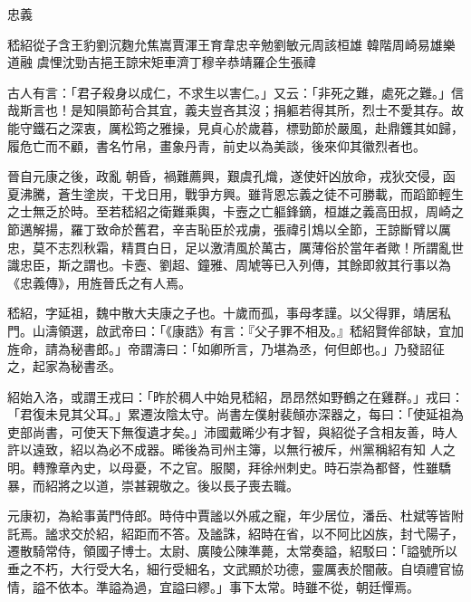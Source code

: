 
\begin{pinyinscope}

 忠義



 嵇紹從子含王豹劉沉麴允焦嵩賈渾王育韋忠辛勉劉敏元周該桓雄
 韓階周崎易雄樂道融
 虞悝沈勁吉挹王諒宋矩車濟丁穆辛恭靖羅企生張禕



 古人有言：「君子殺身以成仁，不求生以害仁。」又云：「非死之難，處死之難。」信哉斯言也！是知隕節茍合其宜，義夫豈吝其沒；捐軀若得其所，烈士不愛其存。故能守鐵石之深衷，厲松筠之雅操，見貞心於歲暮，標勁節於嚴風，赴鼎鑊其如歸，履危亡而不顧，書名竹帛，畫象丹青，前史以為美談，後來仰其徽烈者也。



 晉自元康之後，政亂
 朝昏，禍難薦興，艱虞孔熾，遂使奸凶放命，戎狄交侵，函夏沸騰，蒼生塗炭，干戈日用，戰爭方興。雖背恩忘義之徒不可勝載，而蹈節輕生之士無乏於時。至若嵇紹之衛難乘輿，卡壼之亡軀鋒鏑，桓雄之義高田叔，周崎之節邁解揚，羅丁致命於舊君，辛吉恥臣於戎虜，張禕引鴆以全節，王諒斷臂以厲忠，莫不志烈秋霜，精貫白日，足以激清風於萬古，厲薄俗於當年者歟！所謂亂世識忠臣，斯之謂也。卡壼、劉超、鐘雅、周虓等已入列傳，其餘即敘其行事以為《忠義傳》，用旌晉氏之有人焉。



 嵇紹，字延祖，魏中散大夫康之子也。十歲而孤，事母孝謹。以父得罪，靖居私門。山濤領選，啟武帝曰：「《康誥》有言：『父子罪不相及。』嵇紹賢侔郤缺，宜加旌命，請為秘書郎。」帝謂濤曰：「如卿所言，乃堪為丞，何但郎也。」乃發詔征之，起家為秘書丞。



 紹始入洛，或謂王戎曰：「昨於稠人中始見嵇紹，昂昂然如野鶴之在雞群。」戎曰：「君復未見其父耳。」累遷汝陰太守。尚書左僕射裴頠亦深器之，每曰：「使延祖為吏部尚書，可使天下無復遺才矣。」沛國戴晞少有才智，與紹從子含相友善，時人許以遠致，紹以為必不成器。晞後為司州主簿，以無行被斥，州黨稱紹有知
 人之明。轉豫章內史，以母憂，不之官。服闋，拜徐州刺史。時石崇為都督，性雖驕暴，而紹將之以道，崇甚親敬之。後以長子喪去職。



 元康初，為給事黃門侍郎。時侍中賈謐以外戚之寵，年少居位，潘岳、杜斌等皆附託焉。謐求交於紹，紹距而不答。及謐誅，紹時在省，以不阿比凶族，封弋陽子，遷散騎常侍，領國子博士。太尉、廣陵公陳準薨，太常奏謚，紹駁曰：「謚號所以垂之不朽，大行受大名，細行受細名，文武顯於功德，靈厲表於闇蔽。自頃禮官協情，謚不依本。準謚為過，宜謚曰繆。」事下太常。時雖不從，朝廷憚焉。




\end{pinyinscope}

